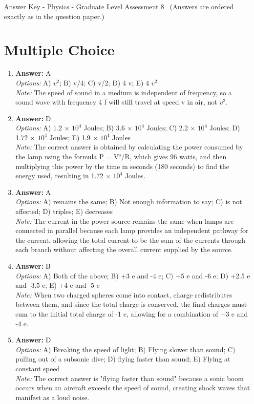 \documentclass[12pt]{article}
\begin{document}
\begin{center}
Answer Key - Physics - Graduate Level Assessment 8 \
\small (Answers are ordered exactly as in the question paper.)
\end{center}

\section*{Multiple Choice}
\begin{enumerate}[label=\arabic*.]
\item \textbf{Answer:} A
\\ \textit{Options:} A) $v^2$; B) v/4; C) v/2; D) 4 v; E) 4 $v^2$
\\ \textit{Note:} The speed of sound in a medium is independent of frequency, so a sound wave with frequency 4 f will still travel at speed v in air, not $v^2$.
\item \textbf{Answer:} D
\\ \textit{Options:} A) 1.2 \ensuremath{\times} $10^4$ Joules; B) 3.6 \ensuremath{\times} $10^4$ Joules; C) 2.2 \ensuremath{\times} $10^4$ Joules; D) 1.72 \ensuremath{\times} $10^4$ Joules; E) 1.9 \ensuremath{\times} $10^4$ Joules
\\ \textit{Note:} The correct answer is obtained by calculating the power consumed by the lamp using the formula P = V²/R, which gives 96 watts, and then multiplying this power by the time in seconds (180 seconds) to find the energy used, resulting in 1.72 × $10^4$ Joules.
\item \textbf{Answer:} A
\\ \textit{Options:} A) remains the same; B) Not enough information to say; C) is not affected; D) triples; E) decreases
\\ \textit{Note:} The current in the power source remains the same when lamps are connected in parallel because each lamp provides an independent pathway for the current, allowing the total current to be the sum of the currents through each branch without affecting the overall current supplied by the source.
\item \textbf{Answer:} B
\\ \textit{Options:} A) Both of the above; B) +3 e and -4 e; C) +5 e and -6 e; D) +2.5 e and -3.5 e; E) +4 e and -5 e
\\ \textit{Note:} When two charged spheres come into contact, charge redistributes between them, and since the total charge is conserved, the final charges must sum to the initial total charge of -1 e, allowing for a combination of +3 e and -4 e.
\item \textbf{Answer:} D
\\ \textit{Options:} A) Breaking the speed of light; B) Flying slower than sound; C) pulling out of a subsonic dive; D) flying faster than sound; E) Flying at constant speed
\\ \textit{Note:} The correct answer is "flying faster than sound" because a sonic boom occurs when an aircraft exceeds the speed of sound, creating shock waves that manifest as a loud noise.
\end{enumerate}
\end{document}
